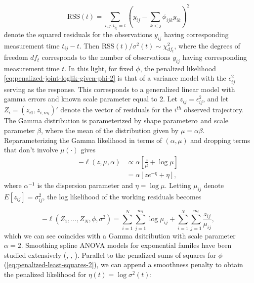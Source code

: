 \begin{equation}
\mbox{RSS}\left( t \right) = \sum_{i,j:t_{ij}= t} \left( y_{ij} - \sum_{k<j} \phi_{ijk} y_{ik}\right)^2
\end{equation}
\noindent
denote the squared residuals for the observations $y_{ij}$ having corresponding measurement time $t_{ij} - t$. Then $\mbox{RSS}\left( t \right)/\sigma^2\left(t\right) \sim \chi^2_{df_t}$, where the degrees of freedom $df_{t}$ corresponds to the number of observations $y_{ij}$ having corresponding measurement time $t$. In this light, for fixed $\phi$, the penalized likelihood \ref{eq:penalized-joint-loglik-given-phi-2} is that of a variance model with the $\epsilon_{ij}^2$ serving as the response.  This corresponds to a generalized linear model with gamma errors and known scale parameter equal to 2. Let $z_{ij} = \epsilon_{ij}^2$, and let $Z_{i} = \left(z_{i1},z_{i,m_i} \right)'$ denote the vector of residuals for the $i^{th}$ observed trajectory. The Gamma distribution is parameterized by shape parameter$\alpha$ and scale parameter $\beta$, where the mean of the distribution given by $\mu = \alpha \beta$. Reparameterizing the Gamma likelihood in terms of $\left(\alpha, \mu \right)$ and dropping terms that don't involve $\mu\left(\cdot\right)$ gives  
\begin{align}
-\ell\left(z,\mu, \alpha \right) &\propto \alpha\left[\frac{z}{\mu} + \log \mu\right]  \label{eq:gamma-iv-likelihood} \\ 
&= \alpha\left[ze^{-\eta} + \eta\right],\label{eq:gamma-iv-likelihood-canonical-link}
\end{align}
\noindent
where $\alpha^{-1}$ is the dispersion parameter and $\eta = \log \mu$. Letting $\mu_{ij}$ denote $E\left[ z_{ij} \right] = \sigma_{ij}^2$, the log likelihood of the working residuals becomes 

\begin{equation} \label{eq:penalized-joint-loglik-given-phi-3}
-\ell\left( Z_1,\dots, Z_N, \phi, \sigma^2 \right) =  \sum_{i = 1}^N \sum_{j = 1}^{m_i} \log \mu_{ij}  + \sum_{i = 1}^N \sum_{j = 1}^{m_i} \frac {z_{ij}}{\mu_{ij}},
\end{equation}
\noindent
which we can see coincides with a Gamma dsitribution with scale parameter $\alpha = 2$. Smoothing spline ANOVA models for exponential familes have been studied extensively (\cite{wahba1995smoothing}, \cite{wang1997grkpack}, \cite{gu2013smoothing}). Parallel to the penalized sums of squares for $\phi$ (\ref{eq:penalized-least-squares-2}), we can append a smoothness penalty to obtain the penalized likelihood for $\eta\left(t\right) = \log\sigma^2\left(t\right)$:


